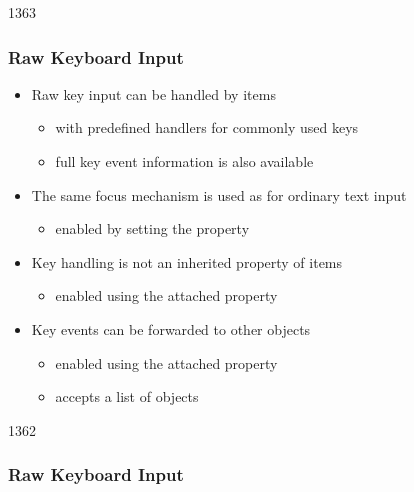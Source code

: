 %
%
%
%

\begin{slide}{1363}\frametitle{Raw Keyboard Input}\label{raw_keyboard_input}

\begin{itemize}
\item Raw key input can be handled by items
  \begin{itemize}
  \item with predefined handlers for commonly used keys
  \item full key event information is also available
  \end{itemize}
\item The same focus mechanism is used as for ordinary text input
  \begin{itemize}
  \item enabled by setting the  property
  \end{itemize}
\item Key handling is not an inherited property of items
  \begin{itemize}
  \item enabled using the  attached property
  \end{itemize}
\item Key events can be forwarded to other objects
  \begin{itemize}
  \item enabled using the  attached property
  \item accepts a list of objects
  \end{itemize}
\end{itemize}

\end{slide}


\begin{slide}{1362}\frametitle{Raw Keyboard Input}


\end{slide}

